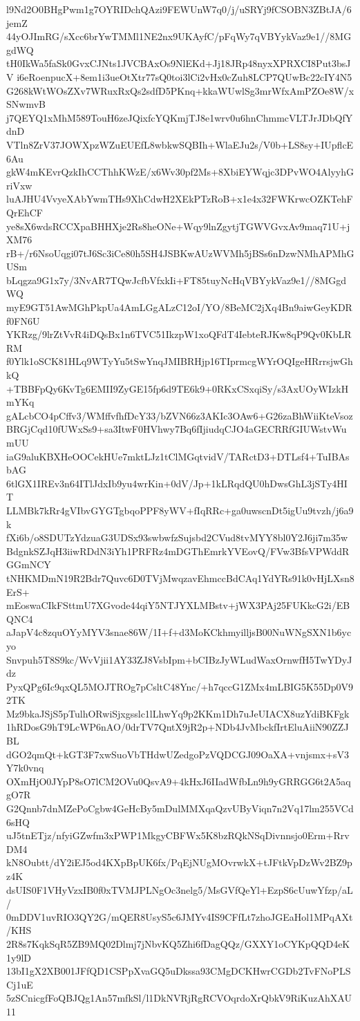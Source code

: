 l9Nd2O0BHgPwm1g7OYRIDchQAzi9FEWUnW7q0/j/uSRYj9fCSOBN3ZBtJA/6jemZ
44yOJImRG/sXcc6brYwTMMl1NE2nx9UKAyfC/pFqWy7qVBYykVaz9e1//8MGgdWQ
tH0IkWa5faSk0GvxCJNts1JVCBAxOs9NlEKd+Jj18JRp48nyxXPRXCI8Put3bsJV
i6eRoenpucX+8em1i3ueOtXtr77sQ0toi3lCi2vHx0cZuh8LCP7QUwBc22cIY4N5
G268kWtWOsZXv7WRuxRxQs2sdfD5PKnq+kkaWUwlSg3mrWfxAmPZOe8W/xSNwmvB
j7QEYQ1xMhM589TouH6zeJQixfcYQKmjTJ8e1wrv0u6hnChmmcVLTJrJDbQfYdnD
VTln8ZrV37JOWXpzWZuEUEfL8wbkwSQBIh+WlaEJu2s/V0b+LS8sy+IUpflcE6Au
gkW4mKEvrQzkIhCCThhKWzE/x6Wv30pf2Ms+8XbiEYWqjc3DPvWO4AlyyhGriVxw
luAJHU4VvyeXAbYwmTHs9XhCdwH2XEkPTzRoB+x1e4x32FWKrwcOZKTehFQrEhCF
ye8sX6wdsRCCXpaBHHXje2Rs8heONe+Wqy9lnZgytjTGWVGvxAv9maq71U+jXM76
rB+/r6NsoUqgi07tJ6Sc3iCe80h5SH4JSBKwAUzWVMh5jBSs6nDzwNMhAPMhGUSm
bLqgza9G1x7y/3NvAR7TQwJcfbVfxkIi+FT85tuyNcHqVBYykVaz9e1//8MGgdWQ
myE9GT51AwMGhPkpUa4AmLGgALzC12oI/YO/8BeMC2jXq4Bn9aiwGeyKDRf0FN6U
YKRzg/9lrZtVvR4iDQsBx1n6TVC51IkzpW1xoQFdT4IebteRJKw8qP9Qv0KbLRRM
f0Ylk1oSCK81HLq9WTyYu5tSwYnqJMIBRHjp16TIprmcgWYrOQIgeHRrrsjwGhkQ
+TBBFpQy6KvTg6EMII9ZyGE15fp6d9TE6k9+0RKxCSxqiSy/s3AxUOyWIzkHmYKq
gALcbCO4pCffv3/WMffvfhfDcY33/bZVN66z3AKIc3OAw6+G26zaBhWiiKteVsoz
BRGjCqd10fUWxSs9+sa3ItwF0HVhwy7Bq6fIjiudqCJO4aGECRRfGIUWstvWumUU
iaG9aluKBXHeOOCekHUe7mktLJz1tClMGqtvidV/TARctD3+DTLsf4+TuIBAsbAG
6tlGX1IREv3n64ITlJdxIb9yu4wrKin+0dV/Jp+1kLRqdQU0hDwsGhL3jSTy4HIT
LLMBk7kRr4gVIbvGYGTgbqoPPF8yWV+fIqRRc+ga0uwscnDt5igUu9tvzh/j6a9k
fXi6b/o8SDUTzYdzuaG3UDSx93swbwfzSujsbd2CVud8tvMYY8bl0Y2J6ji7m35w
BdgnkSZJqH3iiwRDdN3iYh1PRFRz4mDGThEmrkYVEovQ/FVw3BfsVPWddRGGmNCY
tNHKMDmN19R2Bdr7Quvc6D0TVjMwqzavEhmccBdCAq1YdYRs91k0vHjLXsn8ErS+
mEoswaCIkFSttmU7XGvode44qiY5NTJYXLMBstv+jWX3PAj25FUKkcG2i/EBQNC4
aJapV4c8zquOYyMYV3snae86W/1I+f+d3MoKCkhmyilljsB00NuWNgSXN1b6ycyo
Snvpuh5T8S9kc/WvVjii1AY33ZJ8VsbIpm+bCIBzJyWLudWaxOrnwfH5TwYDyJdz
PyxQPg6Ic9qxQL5MOJTROg7pCsltC48Ync/+h7qccG1ZMx4mLBIG5K55Dp0V92TK
Mz9bkaJSjS5pTulhORwiSjxgsslc1lLhwYq9p2KKm1Dh7uJeUIACX8uzYdiBKFgk
1hRDosG9hT9LcWP6nAO/0drTV7QntX9jR2p+NDb4JvMbckfIrtEluAiiN90ZZJBL
dGO2qmQt+kGT3F7xwSuoVbTHdwUZedgoPzVQDCGJ09OaXA+vnjsmx+sV3Y7k0vnq
OXmHjO0JYpP8sO7lCM2OVu0QsvA9+4kHxJ6IIadWfbLn9h9yGRRGG6t2A5aqgO7R
G2Qnnb7dnMZePoCgbw4GeHcBy5mDulMMXqaQzvUByViqn7n2Vq17lm255VCd6sHQ
uJ5tnETjz/nfyiGZwfm3xPWP1MkgyCBFWx5K8bzRQkNSqDivnnsjo0Erm+RrvDM4
kN8Oubtt/dY2iEJ5od4KXpBpUK6fx/PqEjNUgMOvrwkX+tJFtkVpDzWv2BZ9pz4K
dsUIS0F1VHyVzxIB0f0xTVMJPLNgOc3nelg5/MsGVfQeYl+EzpS6cUuwYfzp/aL/
0mDDV1uvRIO3QY2G/mQER8UsyS5c6JMYv4IS9CFfLt7zhoJGEaHol1MPqAXt/KHS
2R8s7KqkSqR5ZB9MQ02Dlmj7jNbvKQ5Zhi6fDagQQz/GXXY1oCYKpQQD4eK1y9lD
13bI1gX2XB001JFfQD1CSPpXvaGQ5uDkssa93CMgDCKHwrCGDb2TvFNoPLSCj1uE
5zSCnicgfFoQBJQg1An57mfkSl/l1DkNVRjRgRCVOqrdoXrQbkV9RiKuzAhXAU11
